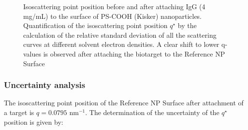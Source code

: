 \begin{figure}
	\centering
		
		\caption{Isoscattering point position before and after attaching IgG (4 mg/mL) to the surface of PS-COOH (Kisker) nanoparticles. Quantification of the isoscattering point position $q^{\star}$ by the calculation of the relative standard deviation of all the scattering curves at different solvent electron densities. A clear shift to lower q-values is observed after attaching the biotarget to the Reference NP Surface}
		\label{fig:CoatedKiskerIsopointComp}
\end{figure}

\subsubsection{Uncertainty analysis}

The isoscattering point position of the Reference NP Surface after attachment of a target is  $q=0.0795$ nm$^{-1}$. The determination of the uncertainty of the $q^{\star}$ position is given by:

